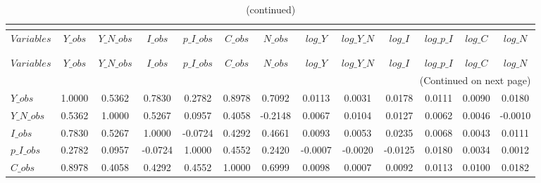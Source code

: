  
\begin{center}
\begin{longtable}{lcccccccccccc} 
\caption{MATRIX OF CORRELATIONS}\\
 \label{Table:th_corr_matrix}\\
\toprule 
$Variables  $	 & 	 $      Y\_obs$	 & 	 $  Y\_N\_obs$	 & 	 $      I\_obs$	 & 	 $  p\_I\_obs$	 & 	 $      C\_obs$	 & 	 $      N\_obs$	 & 	 $      log\_Y$	 & 	 $  log\_Y\_N$	 & 	 $      log\_I$	 & 	 $  log\_p\_I$	 & 	 $      log\_C$	 & 	 $      log\_N$\\
\midrule \endfirsthead 
\caption{(continued)}\\
 \toprule \\ 
$Variables  $	 & 	 $      Y\_obs$	 & 	 $  Y\_N\_obs$	 & 	 $      I\_obs$	 & 	 $  p\_I\_obs$	 & 	 $      C\_obs$	 & 	 $      N\_obs$	 & 	 $      log\_Y$	 & 	 $  log\_Y\_N$	 & 	 $      log\_I$	 & 	 $  log\_p\_I$	 & 	 $      log\_C$	 & 	 $      log\_N$\\
\midrule \endhead 
\midrule \multicolumn{13}{r}{(Continued on next page)} \\ \bottomrule \endfoot 
\bottomrule \endlastfoot 
$Y\_obs     $	 & 	       1.0000	 & 	       0.5362	 & 	       0.7830	 & 	       0.2782	 & 	       0.8978	 & 	       0.7092	 & 	       0.0113	 & 	       0.0031	 & 	       0.0178	 & 	       0.0111	 & 	       0.0090	 & 	       0.0180 \\ 
$Y\_N\_obs  $	 & 	       0.5362	 & 	       1.0000	 & 	       0.5267	 & 	       0.0957	 & 	       0.4058	 & 	      -0.2148	 & 	       0.0067	 & 	       0.0104	 & 	       0.0127	 & 	       0.0062	 & 	       0.0046	 & 	      -0.0010 \\ 
$I\_obs     $	 & 	       0.7830	 & 	       0.5267	 & 	       1.0000	 & 	      -0.0724	 & 	       0.4292	 & 	       0.4661	 & 	       0.0093	 & 	       0.0053	 & 	       0.0235	 & 	       0.0068	 & 	       0.0043	 & 	       0.0111 \\ 
$p\_I\_obs  $	 & 	       0.2782	 & 	       0.0957	 & 	      -0.0724	 & 	       1.0000	 & 	       0.4552	 & 	       0.2420	 & 	      -0.0007	 & 	      -0.0020	 & 	      -0.0125	 & 	       0.0180	 & 	       0.0034	 & 	       0.0012 \\ 
$C\_obs     $	 & 	       0.8978	 & 	       0.4058	 & 	       0.4292	 & 	       0.4552	 & 	       1.0000	 & 	       0.6999	 & 	       0.0098	 & 	       0.0007	 & 	       0.0092	 & 	       0.0113	 & 	       0.0100	 & 	       0.0182 \\ 

\end{longtable}
\end{center}
